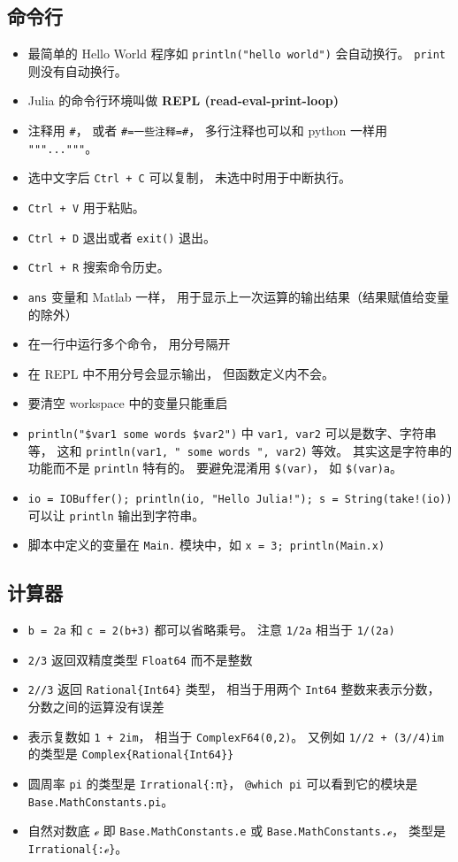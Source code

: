 \subsection{命令行}
\begin{itemize}
\item 最简单的 Hello World 程序如 \verb`println("hello world")` 会自动换行。 \verb`print` 则没有自动换行。
\item Julia 的命令行环境叫做 \textbf{REPL (read-eval-print-loop)}
\item 注释用 \verb`#`， 或者 \verb`#=一些注释=#`， 多行注释也可以和 python 一样用 \verb`"""..."""`。
\item 选中文字后 \verb`Ctrl + C` 可以复制， 未选中时用于中断执行。
\item \verb`Ctrl + V` 用于粘贴。
\item \verb`Ctrl + D` 退出或者 \verb`exit()` 退出。
\item \verb`Ctrl + R` 搜索命令历史。
\item \verb`ans` 变量和 Matlab 一样， 用于显示上一次运算的输出结果（结果赋值给变量的除外）
\item 在一行中运行多个命令， 用分号隔开
\item 在 REPL 中不用分号会显示输出， 但函数定义内不会。
\item 要清空 workspace 中的变量只能重启
\item \verb`println("$var1 some words $var2")` 中 \verb`var1, var2` 可以是数字、字符串等， 这和 \verb`println(var1, " some words ", var2)` 等效。 其实这是字符串的功能而不是 \verb`println` 特有的。 要避免混淆用 \verb`$(var)`， 如 \verb`$(var)a`。
\item \verb`io = IOBuffer(); println(io, "Hello Julia!"); s = String(take!(io))` 可以让 \verb`println` 输出到字符串。
\item 脚本中定义的变量在 \verb`Main.` 模块中，如 \verb`x = 3; println(Main.x)`
\end{itemize}

\subsection{计算器}
\begin{itemize}
\item \verb`b = 2a` 和 \verb`c = 2(b+3)` 都可以省略乘号。 注意 \verb`1/2a` 相当于 \verb`1/(2a)`
\item \verb`2/3` 返回双精度类型 \verb`Float64` 而不是整数
\item \verb`2//3` 返回 \verb`Rational{Int64}` 类型， 相当于用两个 \verb`Int64` 整数来表示分数， 分数之间的运算没有误差
\item 表示复数如 \verb`1 + 2im`， 相当于 \verb`ComplexF64(0,2)`。 又例如 \verb`1//2 + (3//4)im` 的类型是 \verb`Complex{Rational{Int64}}`
\item 圆周率 \verb`pi` 的类型是 \verb`Irrational{:π}`， \verb`@which pi` 可以看到它的模块是 \verb`Base.MathConstants.pi`。
\item 自然对数底 \verb`ℯ` 即 \verb`Base.MathConstants.e` 或 \verb`Base.MathConstants.ℯ`， 类型是 \verb`Irrational{:ℯ}`。
\end{itemize}

